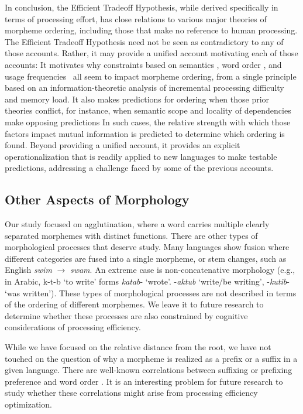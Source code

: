 \documentclass[man]{apa7}
\newcommand{\citep}{\parencite}
\begin{document}
In conclusion, the Efficient Tradeoff Hypothesis, while derived specifically in terms of processing effort, has close relations to various major theories of morpheme ordering, including those that make no reference to human processing.
The Efficient Tradeoff Hypothesis need not be seen as contradictory to any of those accounts.
Rather, it may provide a unified account motivating each of those accounts:
It motivates why constraints based on semantics \citep{bybee-morphology-1985, rice2000morpheme}, word order \citep{givon1971historical,venneman1973explanation,baker1985the}, and usage frequencies~\citep{hay2002speech,plag2002the,plag2009suffix, inkelas2016affix} all seem to impact morpheme ordering, from a single principle based on an information-theoretic analysis of incremental processing difficulty and memory load.
It also makes predictions for ordering when those prior theories conflict, for instance, when semantic scope and locality of dependencies make opposing predictions \citep{saldana2021cross}
In such cases, the relative strength with which those factors impact mutual information is predicted to determine which ordering is found.
Beyond providing a unified account, it provides an explicit operationalization that is readily applied to new languages to make testable predictions, addressing a challenge faced by some of the previous accounts.

\subsection{Other Aspects of Morphology}

Our study focused on agglutination, where a word carries multiple clearly separated morphemes with distinct functions.
There are other types of morphological processes that deserve study.
Many languages show fusion \citep{wals-20} where different categories are fused into a single morpheme, or stem changes, such as English \textit{swim} $\rightarrow$ \textit{swam}.
An extreme case is non-concatenative morphology (e.g., in Arabic, k-t-b `to write' forms \textit{katab}- `wrote'. -\textit{aktub} `write/be writing', -\textit{kutib}- `was written').
These types of morphological processes are not described in terms of the ordering of different morphemes.
We leave it to future research to determine whether these processes are also constrained by cognitive considerations of processing efficiency.

While we have focused on the relative distance from the root, we have not touched on the question of why a morpheme is realized as a prefix or a suffix in a given language.
There are well-known correlations between suffixing or prefixing preference and word order \citep{greenberg1963universals}.
It is an interesting problem for future research to study whether these correlations might arise from processing efficiency optimization.
\end{document}
